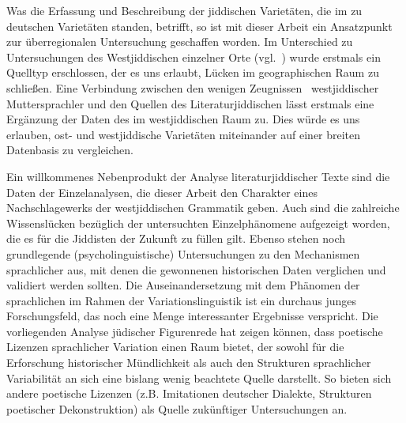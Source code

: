 Was die Erfassung und Beschreibung der jiddischen Varietäten, die im  zu deutschen Varietäten standen, betrifft, so ist mit dieser Arbeit ein Ansatzpunkt zur überregionalen Untersuchung geschaffen worden. Im Unterschied zu Untersuchungen des Westjiddischen einzelner Orte (vgl.\, \citealt{AptrootGruschka2004,Reershemius2007,Reershemius2014,Schaefer2008,Schaefer2010,Schaefer2013,Schaefer2014,Weisskirchen2011}) wurde erstmals ein Quelltyp erschlossen, der es uns erlaubt, Lücken im geographischen Raum zu schließen. Eine Verbindung zwischen den wenigen Zeugnissen \,%
 westjiddischer Muttersprachler und den Quellen des Literaturjiddischen lässt erstmals eine Ergänzung der Daten des  im westjiddischen Raum zu. Dies würde es uns erlauben, ost- und westjiddische Varietäten miteinander auf einer breiten Datenbasis zu vergleichen.


Ein willkommenes Nebenprodukt der Analyse literaturjiddischer Texte sind die Daten der Einzelanalysen, die dieser Arbeit den Charakter eines Nachschlagewerks der westjiddischen Grammatik geben. Auch sind die zahlreiche  Wissenslücken bezüglich der untersuchten Einzelphänomene aufgezeigt worden, die es für die Jiddisten der Zukunft zu füllen gilt. Ebenso stehen noch grundlegende (psycholinguistische) Untersuchungen zu den Mechanismen sprach\-licher  aus, mit denen die gewonnenen historischen Daten verglichen und validiert werden sollten. Die  Auseinandersetzung mit dem Phänomen der sprachlichen  im Rahmen der Variationslinguistik ist ein durchaus junges Forschungsfeld, das  noch eine Menge interessanter Ergebnisse verspricht. Die vorliegenden Analyse jüdischer Figurenrede hat zeigen können, dass poetische Lizenzen sprachlicher Variation einen Raum bietet, der sowohl für die Erforschung historischer Mündlichkeit als auch den Strukturen sprachlicher Variabilität an sich eine bislang wenig beachtete Quelle darstellt. So bieten  sich andere poetische Lizenzen (z.B. Imitationen deutscher Dialekte, Strukturen poetischer Dekonstruktion) als Quelle zukünftiger Untersuchungen an. 